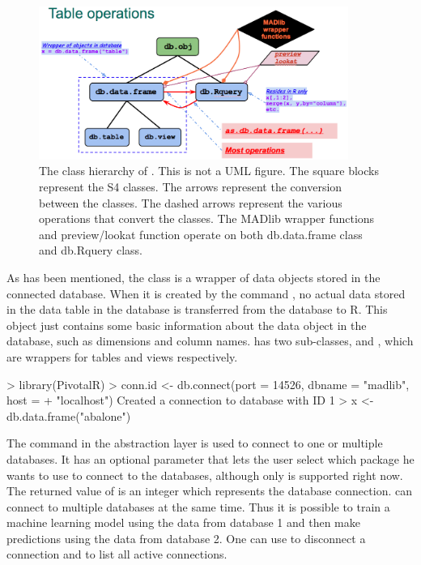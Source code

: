 \begin{figure}[htb]
  \centering
  \includegraphics[width=0.9\textwidth]{class-hierarchy.png}
  \caption{The class hierarchy of . This is not a UML
    figure. The square blocks represent the S4 classes. The arrows
    represent the conversion between the classes. The dashed arrows
    represent the various operations that convert the classes. The
    MADlib wrapper functions and preview/lookat function operate on
    both db.data.frame class and db.Rquery class.}
\label{fig:hierarchy}
\end{figure}

As has been mentioned, the class  is a wrapper
of data objects stored in the connected database. When it is created
by the command , no actual data stored in the
data table in the database is transferred from the database to R. This
object just contains some basic information about the data object in
the database, such as dimensions and column
names.  has two sub-classes, 
and , which are wrappers for tables and views
respectively.

\begin{example}
> library(PivotalR)
> conn.id <- db.connect(port = 14526, dbname = "madlib", host =
+                       "localhost")
Created a connection to database with ID 1
> x <- db.data.frame("abalone")
\end{example}

The command  in the abstraction layer is used to
connect to one or multiple databases. It has an optional parameter
that lets the user select which package he wants to use to connect to
the databases, although only  is supported right
now. The returned value of  is an integer which
represents the database connection.   can connect to
multiple databases at the same time. Thus it is possible to train a
machine learning model using the data from database 1 and then make
predictions using the data from database 2. One can use
 to disconnect a connection and 
to list all active connections.

